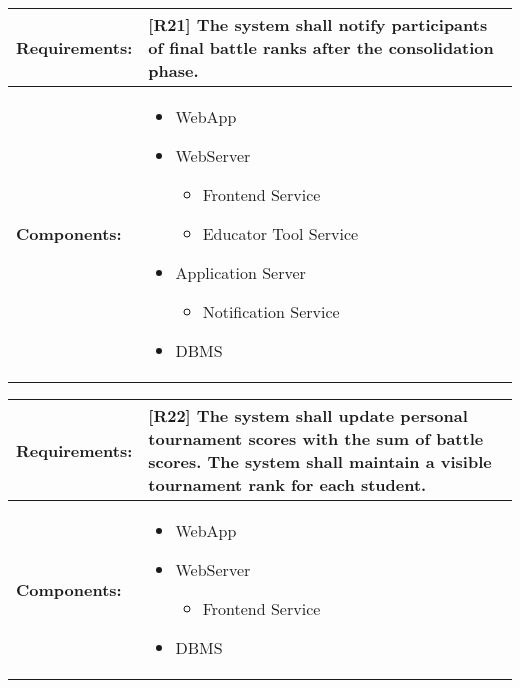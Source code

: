 \begin{table}[!ht]
    \centering
    {\renewcommand{\arraystretch}{2} %
    \setlength{\tabcolsep}{0.5em} %
    \begin{tabularx}{\textwidth}{|l|X|}
    \hline
       \textbf{Requirements:} & [R21] The system shall notify participants of final battle ranks after the consolidation phase.
       \\ \hline
        \textbf{Components:} & 
        \begin{minipage} [t] {0.4\textwidth} 
      \begin{itemize}
      \item WebApp
      \item WebServer
        \begin{itemize}
            \item Frontend Service
            \item Educator Tool Service
        \end{itemize}
      \item Application Server
        \begin{itemize}
            \item Notification Service
        \end{itemize}
      \item DBMS
     \end{itemize} 
    \end{minipage} \\ [2pt]  \hline
    \end{tabularx}} \quad
\end{table}

 \clearpage

\begin{table}[!ht]
    \centering
    {\renewcommand{\arraystretch}{2} %
    \setlength{\tabcolsep}{0.5em} %
    \begin{tabularx}{\textwidth}{|l|X|}
    \hline
       \textbf{Requirements:} & [R22] The system shall update personal tournament scores with the sum of battle scores. \newline
       [R23] The system shall maintain a visible tournament rank for each student.
       \\ \hline
        \textbf{Components:} & 
        \begin{minipage} [t] {0.4\textwidth} 
      \begin{itemize}
      \item WebApp
      \item WebServer
        \begin{itemize}
            \item Frontend Service
        \end{itemize}
      \item DBMS
     \end{itemize} 
    \end{minipage} \\ [2pt]  \hline
    \end{tabularx}} \quad
\end{table}

